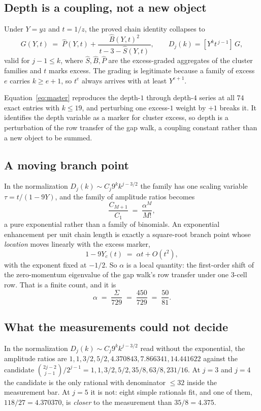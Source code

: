 \documentclass[11pt]{article}
\begin{document}
\subsection{Depth is a coupling, not a new object}

Under $Y = yz$ and $t = 1/z$, the proved chain identity collapses to
\begin{equation}
  G(Y,t) \;=\; \widehat P(Y,t) + \frac{\widehat B(Y,t)^2}{\,t - 3 - \widehat S(Y,t)\,},
  \qquad
  D_j(k) = [Y^k t^{\,j-1}]\,G ,
  \label{eq:master}
\end{equation}
valid for $j - 1 \le k$, where $\widehat S, \widehat B, \widehat P$ are the
excess-graded aggregates of the cluster families and $t$ marks excess. The
grading is legitimate because a family of excess $e$ carries $k \ge e+1$, so
$t^e$ always arrives with at least $Y^{e+1}$.

Equation~\eqref{eq:master} reproduces the depth-$1$ through depth-$4$ series at
all $74$ exact entries with $k \le 19$, and perturbing one excess-$1$ weight by
$+1$ breaks it. It identifies the depth variable as a marker for cluster
excess, so depth is a perturbation of the row transfer of the gap walk, a
coupling constant rather than a new object to be summed.

\subsection{A moving branch point}

In the normalization $D_j(k) \sim C_j 9^k k^{j-3/2}$ the family has one scaling
variable $\tau = t/(1-9Y)$, and the family of amplitude ratios becomes
\[
  \frac{C_{M+1}}{C_1} \;=\; \frac{\alpha^M}{M!},
\]
a pure exponential rather than a family of binomials. An exponential enhancement
per unit chain length is exactly a square-root branch point whose \emph{location}
moves linearly with the excess marker,
\[
  1 - 9Y_c(t) \;=\; \alpha t + O(t^2),
\]
with the exponent fixed at $-1/2$. So $\alpha$ is a local quantity: the
first-order shift of the zero-momentum eigenvalue of the gap walk's row transfer
under one $3$-cell row. That is a finite count, and it is
\[
  \alpha \;=\; \frac{\Sigma}{729} \;=\; \frac{450}{729} \;=\; \frac{50}{81}.
\]

\subsection{What the measurements could not decide}

In the normalization $D_j(k) \sim C_j 9^k k^{j-3/2}$ read without the exponential,
the amplitude ratios are
$1, 1, 3/2, 5/2, 4.370843, 7.866341, 14.441622$ against the candidate
$\binom{2j-2}{j-1}/2^{j-1} = 1, 1, 3/2, 5/2, 35/8, 63/8, 231/16$. At $j = 3$ and
$j = 4$ the candidate is the only rational with denominator $\le 32$ inside the
measurement bar. At $j = 5$ it is not: eight simple rationals fit, and one of
them, $118/27 = 4.370370$, is \emph{closer} to the measurement than
$35/8 = 4.375$.
\end{document}
